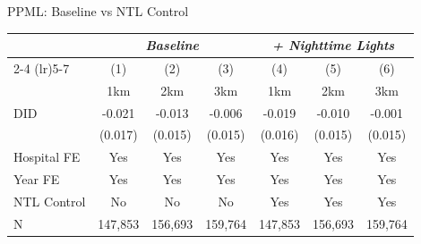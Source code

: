 \documentclass{beamer}
\begin{document}



\begin{frame}{PPML: Baseline vs NTL Control}

\centering
\footnotesize


\begin{table}[htbp]
\centering
\begin{tabular}{lcccccc}
\toprule
& \multicolumn{3}{c}{\textit{Baseline}} 
& \multicolumn{3}{c}{\textit{+ Nighttime Lights}} \\
\cmidrule(lr){2-4} \cmidrule(lr){5-7}
& (1) & (2) & (3) & (4) & (5) & (6) \\
& 1km & 2km & 3km & 1km & 2km & 3km \\
\midrule

DID
& -0.021
& -0.013
& -0.006
& -0.019
& -0.010
& -0.001 \\
& (0.017)
& (0.015)
& (0.015)
& (0.016)
& (0.015)
& (0.015) \\

\midrule

Hospital FE
& Yes & Yes & Yes & Yes & Yes & Yes \\

Year FE
& Yes & Yes & Yes & Yes & Yes & Yes \\

NTL Control
& No & No & No & Yes & Yes & Yes \\

\midrule

N
& 147{,}853
& 156{,}693
& 159{,}764
& 147{,}853
& 156{,}693
& 159{,}764 \\

\bottomrule
\end{tabular}
\end{table}

\end{frame}
\end{document}
